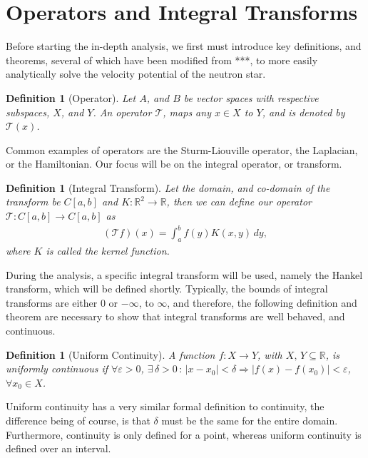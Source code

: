 \documentclass[12pt]{article}
\newtheorem{definition}[theorem]{Definition}
\begin{document}
\doublespacing
\linespread{2}

\section{Operators and Integral Transforms}

Before starting the in-depth analysis, we first must introduce key definitions, and theorems, several of which have been modified from ***, to more easily analytically solve the velocity potential of the neutron star.

\begin{definition}[Operator]
\label{def:operator}
Let $A$, and $B$ be vector spaces with respective subspaces, $X$, and $Y$. An operator $\mathcal{T}$, maps any $x \in X$ to $Y$, and is denoted by $\mathcal{T}(x)$.
\end{definition}

Common examples of operators are the Sturm-Liouville operator, the Laplacian, or the Hamiltonian. Our focus will be on the integral operator, or transform.

\begin{definition}[Integral Transform]
\label{def:transform}
Let the domain, and co-domain of the transform be $C[a,b]$ and $K: \mathbb{R}^2 \rightarrow \mathbb{R}$, then we can define our operator $\mathcal{T}:C[a,b] \rightarrow C[a,b]$ as
\begin{align*}
(\mathcal{T}f)(x) = \int_a^b f(y) K(x,y) \, dy,
\end{align*}
where $K$ is called the kernel function.
\end{definition}

During the analysis, a specific integral transform will be used, namely the Hankel transform, which will be defined shortly. Typically, the bounds of integral transforms are either $0$ or $-\infty$, to $\infty$, and therefore, the following definition and theorem are necessary to show that integral transforms are well behaved, and continuous.

\begin{definition}[Uniform Continuity]
A function $f: X \rightarrow Y$, with $X, \, Y \subseteq \mathbb{R}$, is uniformly continuous if $\forall \varepsilon > 0$, $\exists \, \delta > 0 \, : \, |x-x_0| < \delta \Rightarrow |f(x) - f(x_0)| < \varepsilon$, $ \forall x_0 \in X$.
\end{definition}

Uniform continuity has a very similar formal definition to continuity, the difference being of course, is that  $\delta$ must be the same for the entire domain. Furthermore, continuity is only defined for a point, whereas uniform continuity is defined over an interval.
\end{document}

